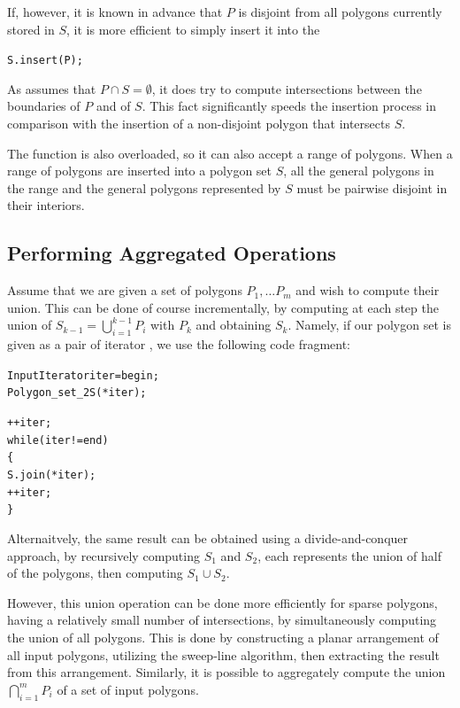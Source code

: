 If, however, it is known in advance that $P$ is disjoint from all polygons
currently stored in $S$, it is more efficient to simply insert it into the
\begin{alltt}
  S.insert (P);
\end{alltt}
As  assumes that $P \cap S = \emptyset$, it does try to
compute intersections between the boundaries of $P$ and of $S$. This fact
significantly speeds the insertion process in comparison with the insertion
of a non-disjoint polygon that intersects $S$.

The  function is also overloaded, so it can also accept a range
of polygons. When a range of polygons are inserted into a polygon set $S$,
all the general polygons in the range and the general polygons represented
by $S$ must be pairwise disjoint in their interiors.

\subsection{Performing Aggregated Operations}
\label{bops_ssec:agg_ops}

Assume that we are given a set of polygons $P_1, \ldots P_m$ and wish
to compute their union. This can be done of course incrementally, by
computing at each step the union of $S_{k-1} = \bigcup_{i=1}^{k-1}{P_i}$
with $P_{k}$ and obtaining $S_k$. Namely, if our polygon set is given
as a pair of iterator \ccc{[begin, end)}, we use the following code
fragment:
\begin{alltt}
  InputIterator   iter = begin;
  Polygon_set_2   S (*iter);

  ++iter;
  while (iter != end) 
  \{
    S.join (*iter);
    ++iter;
  \}
\end{alltt}  
Alternaitvely, the same result can be obtained using a divide-and-conquer
approach, by recursively computing $S_1$ and $S_2$, each represents the
union of half of the polygons, then computing $S_1 \cup S_2$.

However, this union operation can be done more efficiently for sparse polygons,
having a relatively small number of intersections, by simultaneously computing
the union of all polygons. This is done by constructing a planar arrangement
of all input polygons, utilizing the sweep-line algorithm, then extracting
the result from this arrangement. Similarly, it is possible to aggregately
compute the union $\bigcap_{i=1}^{m}{P_i}$ of a set of input polygons.


